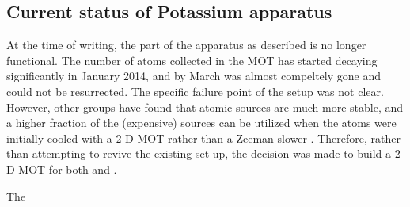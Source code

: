 \subsection{Current status of Potassium apparatus}

At the time of writing, the \K{} part of the apparatus as described is no longer functional. The number of \K{} atoms collected in the MOT has started decaying significantly in January 2014, and by March was almost compeltely gone and could not be resurrected. The specific failure point of the setup was not clear. However, other groups have found that atomic sources are much more stable, and a higher fraction of the (expensive) \K{} sources can be utilized when the atoms were initially cooled with a 2-D MOT rather than a Zeeman slower \cite{Catani2006,UehlingerThesis,Pedrozo2016}. Therefore, rather than attempting to revive the existing set-up, the decision was made to build a 2-D MOT for both \K{} and \Rb{}.

The  